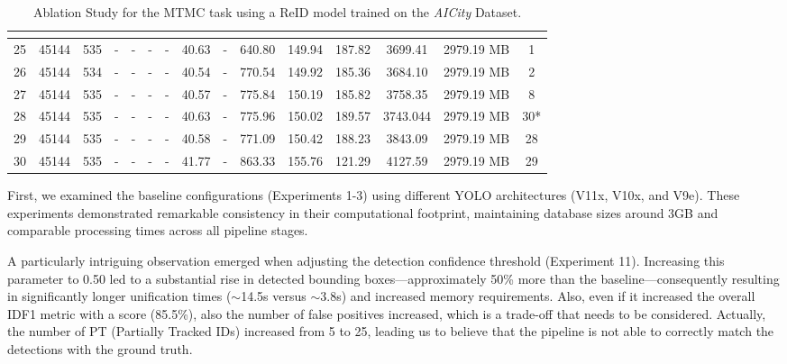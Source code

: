 \begin{table}
{\begin{tabular}{|c||c|c|c|c|c|c|c|c|c|c|c|c|c|c|}
            \hline
            \multicolumn{13}{c}{\rule{0pt}{2.5pt}} \\ %
            \hline
            25 & 45144 & 535 & - & - & - & - & 40.63 & - & 640.80 & 149.94 & 187.82 & 3699.41 & 2979.19 MB & 1 \\
            26 & 45144 & 534 & - & - & - & - & 40.54 & - & 770.54 & 149.92 & 185.36 & 3684.10 & 2979.19 MB & 2 \\
            27 & 45144 & 535 & - & - & - & - & 40.57 & - & 775.84 & 150.19 & 185.82 & 3758.35 & 2979.19 MB & 8 \\
            28 & 45144 & 535 & - & - & - & - & 40.63 & - & 775.96 & 150.02 & 189.57 & 3743.044 & 2979.19 MB & 30* \\
            29 & 45144 & 535 & - & - & - & - & 40.58 & - & 771.09 & 150.42 & 188.23 & 3843.09 & 2979.19 MB & 28 \\
            30 & 45144 & 535 & - & - & - & - & 41.77 & - & 863.33 & 155.76 & 121.29 & 4127.59 & 2979.19 MB & 29 \\
            \hline
        \end{tabular}
    } %
    \vspace{0.5cm}
    \caption[MTMC Ablation Studies]{Ablation Study for the MTMC task using a ReID model trained on the \textit{AICity} Dataset.}
    \label{tab:MTMCAblationStudies}
\end{table}

First, we examined the baseline configurations (Experiments 1-3) using different YOLO architectures (V11x, V10x, and V9e). These experiments demonstrated remarkable consistency in their computational footprint, maintaining database sizes around 3GB and comparable processing times across all pipeline stages.

A particularly intriguing observation emerged when adjusting the detection confidence threshold (Experiment 11). Increasing this parameter to 0.50 led to a substantial rise in detected bounding boxes—approximately 50\% more than the baseline—consequently resulting in significantly longer unification times ($\sim$14.5s versus $\sim$3.8s) and increased memory requirements. Also, even if it increased the overall IDF1 metric with a score (85.5\%), also the number of false positives increased, which is a trade-off that needs to be considered. Actually, the number of PT (Partially Tracked IDs) increased from 5 to 25, leading us to believe that the pipeline is not able to correctly match the detections with the ground truth.

